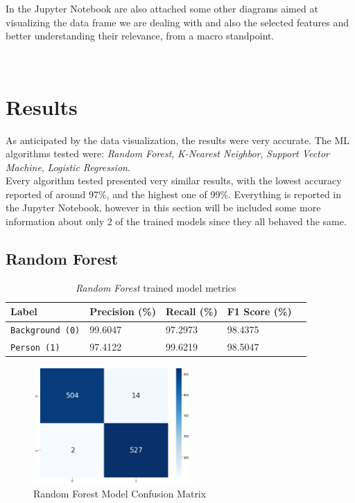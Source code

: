 \documentclass{article}
\begin{document}
In the Jupyter Notebook are also attached some other diagrams aimed at visualizing the data frame we are dealing with and also the selected features and better understanding their relevance, from a macro standpoint.

\newpage~\newpage
\section{Results}

As anticipated by the data visualization, the results were very accurate. The ML algorithms tested were: \textit{Random Forest}, \textit{K-Nearest Neighbor}, \textit{Support Vector Machine}, \textit{Logistic Regression}. \\
Every algorithm tested presented very similar results, with the lowest accuracy reported of around 97\%, and the highest one of 99\%. Everything is reported in the Jupyter Notebook, however in this section will be included some more information about only 2 of the trained models since they all behaved the same.

\subsection[]{Random Forest}

\begin{table}[h!]
	\centering
	\begin{tabular}{l|llll}
		\toprule 
		Label & Precision (\%) & Recall (\%) & F1 Score (\%) \\
		\midrule
		\rowcolor{black!10} \texttt{Background (0)} & 99.6047 & 97.2973 & 98.4375 \\
		\texttt{Person (1)} & 97.4122 & 99.6219 & 98.5047 \\
		\bottomrule
	\end{tabular}
	\caption{\textit{Random Forest} trained model metrics}
	\label{tab:rf-results}
 \end{table}

\begin{figure}[h!]
	\centering
	\includegraphics[width=6cm]{assets/rf-confusion-matrix.png}
	\caption{Random Forest Model Confusion Matrix}
	\label{fig::rf-confusion-matrix}
\end{figure}
\end{document}
